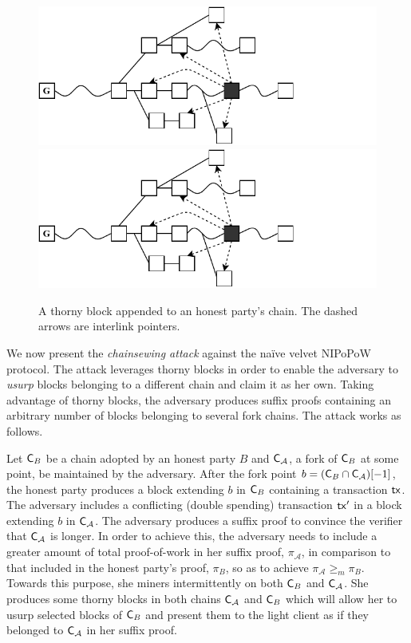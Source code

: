 \begin{figure}[h]
	\begin{center}
		\iftwocolumn
			\includegraphics[width=0.9\columnwidth]{figures/thorny_block.pdf}
		\else
			\includegraphics[width=0.7\columnwidth]{figures/thorny_block.pdf}
		\fi
	\end{center}
	\caption{A thorny block appended to an honest party's chain.
	The dashed arrows are interlink pointers.}
	\label{fig:thorny_block}
\end{figure}

We now present the \emph{chainsewing attack} against the na\"ive velvet NIPoPoW
protocol. The attack leverages thorny blocks in order to enable the adversary to
\emph{usurp} blocks belonging to a different chain and claim it as her own.
Taking advantage of thorny blocks, the adversary produces suffix proofs
containing an arbitrary number of blocks belonging to several fork chains. The
attack works as follows.

Let $\mathsf{C}_B$ be a chain adopted by an honest party $B$ and $\mathsf{C}_\mathcal{A}$, a fork of $\mathsf{C}_B$ at some point, be maintained by the adversary. After the fork point $b = (\mathsf{C}_B \cap \mathsf{C}_\mathcal{A})[-1]$, the honest party produces a block extending $b$ in $\mathsf{C}_B$ containing a transaction $\mathsf{tx}$. The adversary includes a conflicting (double spending) transaction $\mathsf{tx}'$ in a block extending $b$ in $\mathsf{C}_\mathcal{A}$.
The adversary produces a suffix proof to convince the verifier that $\mathsf{C}_\mathcal{A}$ is longer. In order to achieve this, the adversary needs to include a greater amount of total proof-of-work in her suffix proof, $\pi_\mathcal{A}$, in comparison to that included in the honest party's proof, $\pi_B$, so as to achieve $\pi_\mathcal{A} \geq_m \pi_B$. Towards this purpose, she miners intermittently on both $\mathsf{C}_B$ and $\mathsf{C}_\mathcal{A}$. She produces some thorny blocks in both chains $\mathsf{C}_\mathcal{A}$ and $\mathsf{C}_B$ which will allow her to usurp selected blocks of $\mathsf{C}_B$ and present them to the light client as if they belonged to $\mathsf{C}_\mathcal{A}$ in her suffix proof.

